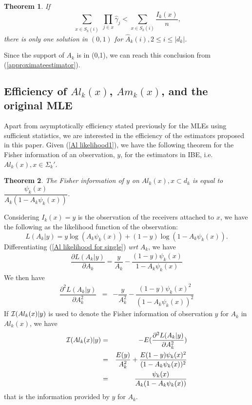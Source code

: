 \documentclass[10pt,onecolumn]{IEEEtran}
\newtheorem{theorem}{\bf Theorem}
\begin{document}
\begin{theorem}
If
\[
\sum_{\substack{ x \in S_k(i)}} \prod_{j \in x} \hat\gamma_j < \sum_{x \in S_k(i)}\dfrac{I_k(x)}{n},
\]
there is only one solution in $(0,1)$ for $\widehat A_k(i), 2 \leq i \leq |d_k|$.
\end{theorem}
\begin{IEEEproof}
Since the support of $ A_k$ is in (0,1), we can reach this conclusion from (\ref{approximateestimator}).
\end{IEEEproof}










\subsection{Efficiency of  $Al_k(x)$, $Am_k(x)$, and the original MLE}
Apart from  asymptotically efficiency stated previously for the MLEs using sufficient statistics, we are interested in the efficiency of the estimators proposed in this paper. Given (\ref{Al likelihood1}), we have the following theorem for the Fisher information of an observation, $y$, for the estimators in IBE, i.e. $Al_k(x), x \in \Sigma_k'$.
\begin{theorem} \label{Al fisher}
The Fisher information of $y$ on $Al_k(x), x \subset d_k$ is equal to $ \dfrac{\psi_k(x)}{A_k (1-A_k \psi_k(x))}$.
\end{theorem}
\begin{IEEEproof}
Considering $I_k(x)=y$ is the observation of the receivers attached to $x$, we have the following as the likelihood function of the observation:
\begin{equation}
L(A_k|y)=y\log (A_k\psi_k(x))+(1-y)\log(1-A_k\psi_k(x)).
\label{Al likelihood for single}
\end{equation}
Differentiating (\ref{Al likelihood for single}) {\it wrt} $A_k$, we have
\begin{eqnarray}
\dfrac{\partial L(A_k|y)}{\partial A_k}=\dfrac{y}{A_k}-\dfrac{(1-y)\psi_k(x)}{1-A_k\psi_k(x)}
\end{eqnarray}
We then have
\begin{eqnarray}
\dfrac{\partial^2 L(A_k|y)}{\partial A_k^2}&=& -\dfrac{y}{A_k^2}-\dfrac{(1-y)\psi_k(x)^2}{(1-A_k\psi_k(x))^2}
\end{eqnarray}
If ${\cal I}(Al_k(x)|y)$ is used to denote the Fisher information of observation $y$ for $A_k$ in $Al_k(x)$, we  have
\begin{eqnarray}\label{fisher}
{\cal I}(Al_k(x)|y)&=&-E(\dfrac{\partial^2 L(A_k|y)}{\partial A_k^2}) \nonumber \\
&=&\dfrac{E(y)}{A_k^2}+\dfrac{E(1-y)\psi_k(x)^2}{(1-A_k\psi_k(x))^2} \nonumber \\
&=&\dfrac{\psi_k(x)}{A_k (1-A_k \psi_k(x))}
\end{eqnarray}
that is the information provided by $y$ for $A_k$.
\end{IEEEproof}
\end{document}

